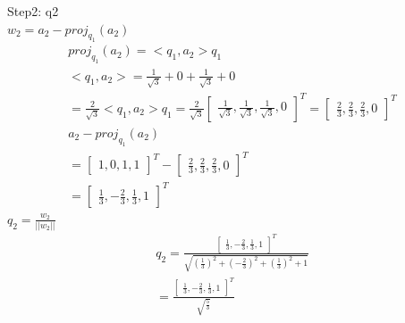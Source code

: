 \documentclass[12pt]{article}
\begin{document}
\begin{flushleft}
    Step2: q2 \\
    $w_{2} = a_{2} - proj_{q_{1}}(a_{2})$ \\
    \begin{align}
        proj_{q_{1}}(a_{2}) = <q_{1},a_{2}>q_{1}                        \\
        <q_{1},a_{2}> = \frac{1}{\sqrt{3}} + 0 + \frac{1}{\sqrt{3}} + 0 \\
        = \frac{2}{\sqrt{3}}
        <q_{1},a_{2}>q_{1} = \frac{2}{\sqrt{3}}\begin{bmatrix}
                                                   \frac{1}{\sqrt{3}}, \frac{1}{\sqrt{3}}, \frac{1}{\sqrt{3}}, 0
                                               \end{bmatrix}^{T}
        =  \begin{bmatrix}
               \frac{2}{3}, \frac{2}{3}, \frac{2}{3}, 0
           \end{bmatrix}^{T}                      \\
        a_{2} - proj_{q_{1}}(a_{2})                                     \\
        =  \begin{bmatrix}
               1, 0, 1, 1
           \end{bmatrix}^{T} - \begin{bmatrix}
                                   \frac{2}{3}, \frac{2}{3}, \frac{2}{3}, 0
                               \end{bmatrix}^{T}  \\
        = \begin{bmatrix}
              \frac{1}{3}, -\frac{2}{3}, \frac{1}{3}, 1
          \end{bmatrix}^{T}
    \end{align}
    $q_{2} = \frac{w_{2}}{||w_{2}||}$ \\
    \begin{align}
        q_{2} = \frac{\begin{bmatrix}
                          \frac{1}{3}, -\frac{2}{3}, \frac{1}{3}, 1
                      \end{bmatrix}^{T}}{\sqrt{(\frac{1}{3})^{2} + (-\frac{2}{3})^{2} + (\frac{1}{3})^{2} + 1}}                                                                                                      \\
        = \frac{\begin{bmatrix}
                    \frac{1}{3}, -\frac{2}{3}, \frac{1}{3}, 1
                \end{bmatrix}^{T}}{\sqrt{\frac{5}{3}}}

\end{align}
\end{flushleft}
\end{document}
